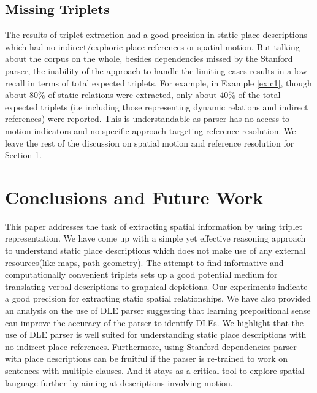\documentclass{acm_proc_article-sp}
\begin{document}
\subsection{Missing Triplets}
\label{missing}
The results of triplet extraction had a good precision in static place descriptions which had no indirect/exphoric place references or spatial motion. But talking about the corpus on the whole, besides dependencies missed by the Stanford parser, the inability of the approach to handle the limiting cases results in a low recall in terms of total expected triplets. For example, in Example \ref{ex:c1}, though about 80\% of static relations were extracted, only about 40\% of the total expected triplets (i.e including those representing dynamic relations and indirect references) were reported. This is understandable as parser has no access to motion indicators and no specific approach targeting reference resolution. We leave the rest of the discussion on spatial motion and reference resolution for Section \ref{sec:conclusion}.

\section{Conclusions and Future Work}
\label{sec:conclusion}
This paper addresses the task of extracting spatial information by using triplet representation. We have come up with a simple yet effective reasoning approach to understand static place descriptions which does not make use of any external resources(like maps, path geometry). The attempt to find informative and computationally convenient triplets sets up a good potential medium for translating verbal descriptions to graphical depictions. Our experiments indicate a good precision for extracting static spatial relationships. We have also provided an analysis on the use of DLE parser suggesting that learning prepositional sense can improve the accuracy of the parser to identify DLEs. We highlight that the use of DLE parser is well suited for understanding static place descriptions with no indirect place references. Furthermore, using Stanford dependencies parser with place descriptions can be fruitful if the parser is re-trained to work on sentences with multiple clauses. And it stays as a critical tool to explore spatial language further by aiming at descriptions involving motion. 
\end{document}
